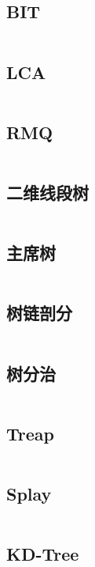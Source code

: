 \documentclass[titlepage,landscape,a4paper,10pt]{article}
\begin{document}
\begin{multicols}{2}
\begin{spacing}{0.8}
\subsection{BIT}
\inputminted{cpp}{DataStructure/BIT.cpp}

\subsection{LCA}
\inputminted{cpp}{DataStructure/LCA.cpp}

\subsection{RMQ}
\inputminted{cpp}{DataStructure/RMQ.cpp}

\subsection{二维线段树}
\inputminted{cpp}{DataStructure/二维线段树.cpp}

\subsection{主席树}
\inputminted{cpp}{DataStructure/主席树.cpp}

\subsection{树链剖分}
\inputminted{cpp}{DataStructure/树链剖分.cpp}

\subsection{树分治}
\inputminted{cpp}{DataStructure/树分治.cpp}

\subsection{Treap}
\inputminted{cpp}{DataStructure/treap.cpp}

\subsection{Splay}
\inputminted{cpp}{DataStructure/Splay.cpp}

\subsection{KD-Tree}
\inputminted{cpp}{DataStructure/KDT.cpp}


\end{spacing}
\end{multicols}
\end{document}
